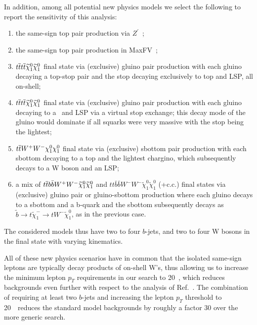 In addition, among all potential new physics models 
we select the following to report the sensitivity of this analysis:
\begin{enumerate}
\item the same-sign top pair production via $Z^\prime$~\cite{sstop,fcnczprime};

\item the same-sign top pair production in MaxFV~\cite{mxflv3};

\item $t\overline{t} t\overline{t} \widetilde\chi_1^0\widetilde\chi_1^0$ final state via (exclusive) gluino pair production with 
each gluino decaying a top-stop pair and the stop decaying
exclusively to top and LSP, all on-shell;

\item $t\overline{t} t\overline{t} \widetilde\chi_1^0\widetilde\chi_1^0$ final state via (exclusive) gluino pair production with 
each gluino decaying to a \ttbar\ and LSP 
via a virtual stop exchange\cite{T1tttt}; 
this decay mode of the gluino would dominate 
if all squarks were very massive with the stop being the lightest;
\item $t\overline{t} W^+W^- \chi_1^0\chi_1^0 $ final state via (exclusive) sbottom pair production with each 
sbottom decaying to a top and the lightest chargino, which subsequently decays to a W boson and an LSP;
\item a mix of $t\overline{t} b\bar{b} W^+W^- \widetilde\chi_1^0\widetilde\chi_1^0 $ and 
  $tt\bar{b}\bar{b}W^-W^-\tilde{\chi}_1^0\tilde{\chi}_1^0$ (+c.c.) final states via (exclusive) gluino pair or gluino-sbottom
  production where each gluino decays to a sbottom and a b-quark and the sbottom subsequently decays as
  $\widetilde{b} \to t \widetilde{\chi}^-_1 \to t W^- \widetilde{\chi}^0_1  $, as in the previous case.
\end{enumerate}
The considered models thus have two to four $b$-jets, and two to four W bosons in the final state with varying kinematics.

All of these new physics scenarios have in common that the isolated same-sign leptons are typically decay products of on-shell W's,
thus allowing us to increase the minimum lepton $p_T$ 
requirements in our search to 20~\GeV, which reduces backgrounds even further
with respect to the analysis of Ref.~\cite{sspaper2010,sspaper2011,ssnote2011}.
The combination of requiring at least two $b$-jets and increasing the lepton $p_T$ threshold to 20~\GeV\ reduces the standard model backgrounds
by roughly a factor 30 over the more generic search.


